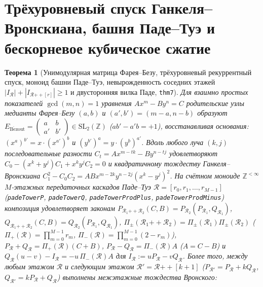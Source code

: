 \documentclass[11pt,a4paper]{article}
\theoremstyle{plain}
\newtheorem{theorem}{Теорема}[section]
\theoremstyle{definition}
\begin{document}
\section{Трёхуровневый спуск Ганкеля--Вронскиана, башня Паде--Туэ и бескорневое кубическое сжатие}
\label{sec:pade-thue}

\begin{theorem}[Унимодулярная матрица Фарея--Безу, трёхуровневый рекуррентный спуск, моноид башни Паде--Туэ, невырожденность соседних этажей $|I_{\mathcal{R}}| + |I_{\mathcal{R}\mathbin{+\!+}[r]}| \ge 1$ и двусторонняя вилка Паде, \texttt{thm7}]
\label{thm:main-7}
Для взаимно простых показателей $\gcd(m,n)=1$ уравнения $A x^m - B y^n = C$ родительские узлы медианты Фарея--Безу $(a,b)$ и $(a',b') = (m-a,n-b)$ образуют $E_{\mathrm{B\acute{e}zout}} = \begin{pmatrix} a & b \\ a' & b' \end{pmatrix}\in\mathrm{SL}_2(\mathbb{Z})$ ($a b' - a' b = +1$), восстанавливая основания: $(x^a)^{b'} = x\cdot (x^{a'})^b$ и $(y^{b'})^a = y\cdot (y^b)^{a'}$. Вдоль любого луча $(k,j)$ последовательные разности $C_t = A x^{m-tk} - B y^{n-tj}$ удовлетворяют $C_0 - (x^k+y^j)C_1 + x^k y^j C_2 = 0$ и квадратичному тождеству Ганкеля--Вронскиана $C_1^2 - C_0 C_2 = A B x^{m-2k}y^{n-2j}(x^k-y^j)^2$. На счётном моноиде $\mathbb{Z}^{<\infty}$ $M$-этажных передаточных каскадов Паде--Туэ $\mathcal{R} = [r_0,r_1,\dots,r_{M-1}]$ (\texttt{padeTowerP}, \texttt{padeTowerQ}, \texttt{padeTowerProdPlus}, \texttt{padeTowerProdMinus}) композиция удовлетворяет законам $P_{\mathcal{R}_1\mathbin{+\!+}\mathcal{R}_2}(C,B) = P_{\mathcal{R}_2}(P_{\mathcal{R}_1},Q_{\mathcal{R}_1})$, $Q_{\mathcal{R}_1\mathbin{+\!+}\mathcal{R}_2}(C,B) = Q_{\mathcal{R}_2}(P_{\mathcal{R}_1},Q_{\mathcal{R}_1})$, $\Pi_\pm(\mathcal{R}_1\mathbin{+\!+}\mathcal{R}_2) = \Pi_\pm(\mathcal{R}_1)\Pi_\pm(\mathcal{R}_2)$ ($\Pi_+(\mathcal{R})=\prod_{m=0}^{M-1}r_m$, $\Pi_-(\mathcal{R})=\prod_{m=0}^{M-1}(2-r_m)$), $P_{\mathcal{R}}+Q_{\mathcal{R}} = \Pi_+(\mathcal{R})(C+B)$, $P_{\mathcal{R}}-Q_{\mathcal{R}} = \Pi_-(\mathcal{R})A$ ($A=C-B$) и $Q_{\mathcal{R}}(u-v) - I_{\mathcal{R}} = -u\,\Pi_-(\mathcal{R})A$ для $I_{\mathcal{R}} := u P_{\mathcal{R}} - v Q_{\mathcal{R}}$. Более того, между любым этажом $\mathcal{R}$ и следующим этажом $\mathcal{R}' = \mathcal{R}\mathbin{+\!+}[k+1]$ ($P_{\mathcal{R}'} = P_{\mathcal{R}} + k Q_{\mathcal{R}}$, $Q_{\mathcal{R}'} = k P_{\mathcal{R}} + Q_{\mathcal{R}}$) выполнены межэтажные тождества Вронского:
\begin{equation}

\end{equation}
\end{theorem}
\end{document}
